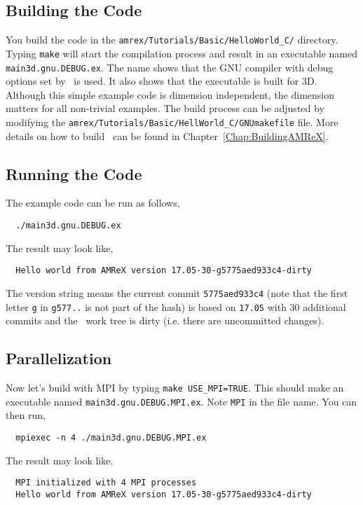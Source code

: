 \subsection{Building the Code}

You build the code in the {\tt amrex/Tutorials/Basic/HelloWorld\_C/}
directory.  Typing {\tt make} will start the compilation process and
result in an executable named {\tt main3d.gnu.DEBUG.ex}.  The name
shows that the GNU compiler with debug options set by \amrex\ is used.
It also shows that the executable is built for 3D.  Although this
simple example code is dimension independent, the dimension matters
for all non-trivial examples.  The build process can be adjusted by
modifying the {\tt amrex/Tutorials/Basic/HellWorld\_C/GNUmakefile} file.
More details on how to build \amrex\ can be found in
Chapter~\ref{Chap:BuildingAMReX}.

\subsection{Running the Code}

The example code can be run as follows,
\begin{verbatim}
  ./main3d.gnu.DEBUG.ex
\end{verbatim}
The result may look like,
\begin{verbatim}
  Hello world from AMReX version 17.05-30-g5775aed933c4-dirty
\end{verbatim}
The version string means the current commit {\tt 5775aed933c4} (note
that the first letter {\tt g} in {\tt g577..} is not part of the hash)
is based on {\tt 17.05} with 30 additional commits and the \amrex\
work tree is dirty (i.e. there are uncommitted changes).

\subsection{Parallelization}

Now let's build with MPI by typing {\tt make USE\_MPI=TRUE}.  This
should make an executable named {\tt main3d.gnu.DEBUG.MPI.ex}.  Note
{\tt MPI} in the file name.  You can then run,
\begin{verbatim}
  mpiexec -n 4 ./main3d.gnu.DEBUG.MPI.ex
\end{verbatim}
The result may look like,
\begin{verbatim}
  MPI initialized with 4 MPI processes
  Hello world from AMReX version 17.05-30-g5775aed933c4-dirty
\end{verbatim}

